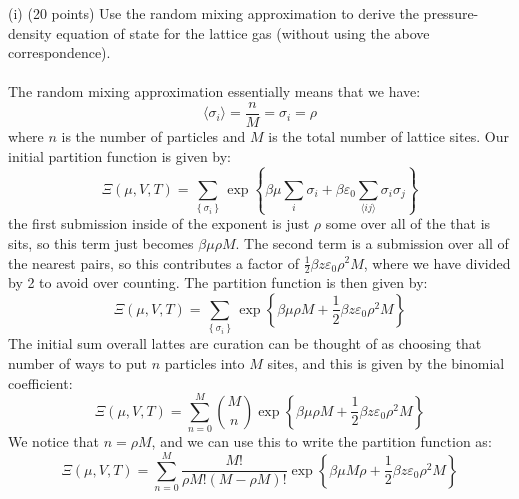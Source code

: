 \documentclass[12pt]{article}
\begin{document}
(i) (20 points) Use the random mixing approximation to derive the pressure-density equation of state for the lattice gas (without using the above correspondence).\\\\
The random mixing approximation essentially means that we have:
\begin{equation}
\langle \sigma _{i} \rangle = \frac{n}{M}=\sigma _{i} = \rho
\end{equation}
where $n$ is the number of particles and $M$ is the total number of lattice sites. Our initial partition function is given by:
\begin{equation}
\Xi(\mu, V, T)=\sum_{\left\{\sigma_{i}\right\}} \exp \left\{\beta \mu \sum_{i} \sigma_{i}+\beta \varepsilon_{0} \sum_{\langle i j\rangle} \sigma_{i} \sigma_{j}\right\}
\end{equation}  
the first submission inside of the exponent is just $\rho$ some over all of the that is sits, so this term just becomes $\beta \mu \rho M$. The second term is a submission over all of the nearest pairs, so this contributes a factor of $\frac{1}{2} \beta z \varepsilon _{0} \rho ^{2} M$, where we have divided by 2 to avoid over counting. The partition function is then given by:
\begin{equation}
\Xi(\mu, V, T) = \sum_{\left\{\sigma_{i}\right\}} \exp \left\{\beta \mu \rho M + \frac{1}{2} \beta z \varepsilon _{0} \rho ^{2} M\right\} 
\end{equation}
The initial sum overall lattes are curation can be thought of as choosing that number of ways to put $n$ particles into $M$ sites, and this is given by the binomial coefficient:
\begin{equation}
\Xi(\mu, V, T) = \sum_{n=0}^{M} \binom{M}{n} \exp \left\{\beta \mu \rho M + \frac{1}{2} \beta z \varepsilon _{0} \rho ^{2} M\right\}
\end{equation}
We notice that $n= \rho M$, and we can use this to write the partition function as:
\begin{equation}
\Xi(\mu, V, T) = \sum_{n=0}^{M} \frac{M!}{\rho M! (M - \rho M)!} \exp \left\{\beta \mu M \rho + \frac{1}{2} \beta z \varepsilon _{0} \rho ^{2} M\right\}
\end{equation}
\end{document}
